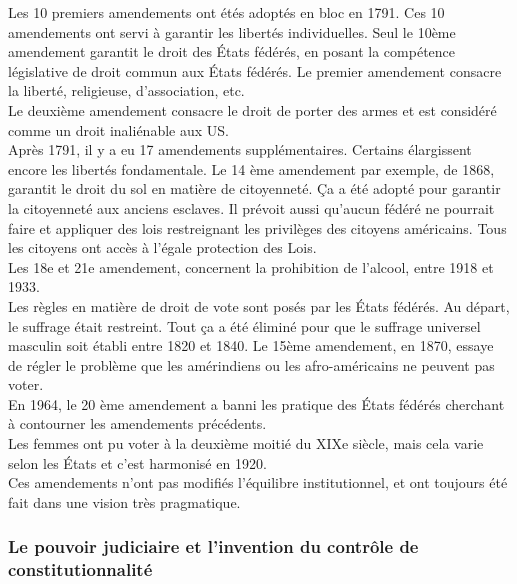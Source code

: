 \documentclass[10pt, a4paper, openany]{book}
\begin{document}
Les 10 premiers amendements ont étés adoptés en bloc en 1791. Ces 10 amendements ont servi à garantir les libertés individuelles. Seul le 10ème amendement garantit le droit des États fédérés, en posant la compétence législative de droit commun aux États fédérés. Le premier amendement consacre la liberté, religieuse, d'association, etc. \\
Le deuxième amendement consacre le droit de porter des armes et est considéré comme un droit inaliénable aux US. \\
Après 1791, il y a eu 17 amendements supplémentaires. Certains élargissent encore les libertés fondamentale. Le 14 ème amendement par exemple, de 1868, garantit le droit du sol en matière de citoyenneté. Ça a été adopté pour garantir la citoyenneté aux anciens esclaves. Il prévoit aussi qu'aucun fédéré ne pourrait faire et appliquer des lois restreignant les privilèges des citoyens américains. Tous les citoyens ont accès à l'égale protection des Lois. \\
Les 18e et 21e amendement, concernent la prohibition de l'alcool, entre 1918 et 1933. \\
Les règles en matière de droit de vote sont posés par les États fédérés. Au départ, le suffrage était restreint. Tout ça a été éliminé pour que le suffrage universel masculin soit établi entre 1820 et 1840. Le 15ème amendement, en 1870, essaye de régler le problème que les amérindiens ou les afro-américains ne peuvent pas voter. \\
En 1964, le 20 ème amendement a banni les pratique des États fédérés cherchant à contourner les amendements précédents. \\
Les femmes ont pu voter à la deuxième moitié du XIXe siècle, mais cela varie selon les États et c'est harmonisé en 1920. \\
Ces amendements n'ont pas modifiés l'équilibre institutionnel, et ont toujours été fait dans une vision très pragmatique. 


\subsubsection{Le pouvoir judiciaire et l'invention du contrôle de constitutionnalité}
\end{document}
